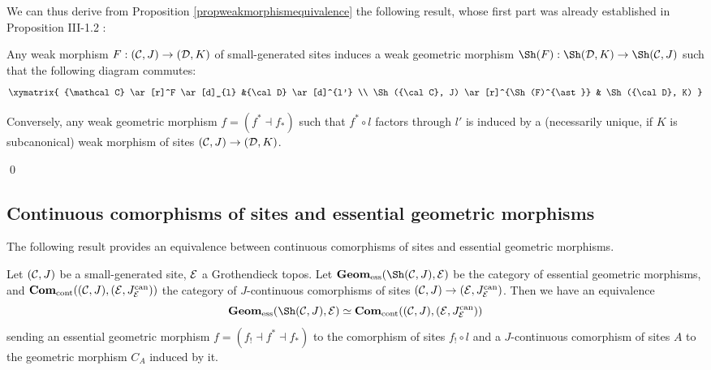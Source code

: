 \documentclass[a4paper,12pt]{article}
\begin{document}
We can thus derive from Proposition \ref{propweakmorphismequivalence} the following result, whose first part was already established in Proposition III-1.2 \cite{grothendieck}:

\begin{proposition}
	Any weak morphism $F:({\cal C}, J)\to ({\cal D}, K)$ of small-generated sites induces a weak geometric morphism $\Sh(F):\Sh({\cal D}, K)\to \Sh({\cal C}, J)$ such that the following diagram commutes: 
	$$
	\xymatrix{
		{\mathcal C} \ar[r]^F \ar[d]_{l} &{\cal D} \ar[d]^{l'} \\
		\Sh({\cal C}, J) \ar[r]^{\Sh(F)^{\ast}} & \Sh({\cal D}, K)
	}
	$$ 
	
	Conversely, any weak geometric morphism $f=(f^{\ast}\dashv f_{\ast})$ such that $f^{\ast}\circ l$ factors through $l'$ is induced by a (necessarily unique, if $K$ is subcanonical) weak morphism of sites $({\cal C}, J)\to ({\cal D}, K)$.    
\end{proposition}\qed







\subsection{Continuous comorphisms of sites and essential geometric morphisms}\label{sec:essentialmorphismsandcomorphisms}

The following result provides an equivalence between continuous comorphisms of sites and essential geometric morphisms. 

\begin{theorem}\label{thmequivalencecomorphisms}
	Let $({\cal C}, J)$ be a small-generated site, $\cal E$ a Grothendieck topos. Let ${\textup{\bf Geom}}_{\textup{ess}}(\Sh({\cal C}, J), {\cal E})$ be the category of essential geometric morphisms, and $	{\textup{\bf Com}}_{\textup{cont}}(({\cal C}, J), ({\cal E}, J^{\textup{can}}_{\cal E}))$ the category of $J$-continuous comorphisms of sites $({\cal C}, J)\to ({\cal E}, J^{\textup{can}}_{\cal E})$. Then we have an equivalence
	\[
	{\textup{\bf Geom}}_{\textup{ess}}(\Sh({\cal C}, J), {\cal E}) \simeq 	{\textup{\bf Com}}_{\textup{cont}}(({\cal C}, J), ({\cal E}, J^{\textup{can}}_{\cal E}))
	\] 
	sending an essential geometric morphism $f=(f_{!}\dashv f^{\ast}\dashv f_{\ast})$ to the comorphism of sites $f_{!}\circ l$ and a $J$-continuous comorphism of sites $A$ to the geometric morphism $C_{A}$ induced by it. 
\end{theorem}
\end{document}

